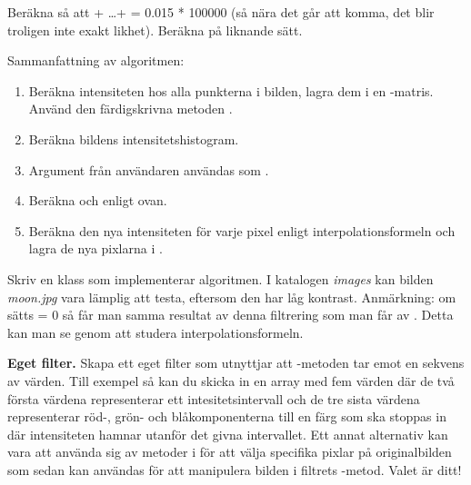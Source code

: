 Beräkna  så att  + \ldots +  = 0.015 * 100000 (så nära det går att komma, det blir troligen inte exakt likhet). Beräkna  på liknande sätt.

Sammanfattning av algoritmen:
\begin{enumerate}
	\item Beräkna intensiteten hos alla punkterna i bilden, lagra dem i en -matris. Använd den färdigskrivna metoden .
	\item Beräkna bildens intensitetshistogram.
	\item Argument från användaren användas som .
	\item Beräkna  och  enligt ovan.
	\item Beräkna den nya intensiteten för varje pixel enligt interpolationsformeln och lagra de nya pixlarna i .
\end{enumerate}
Skriv en klass  som implementerar algoritmen. I katalogen \emph{images} kan bilden \emph{moon.jpg} vara lämplig att testa, eftersom den har låg kontrast. Anmärkning: om  sätts = 0 så får man samma resultat av denna filtrering som man får av . Detta kan man se genom att studera interpolationsformeln.

\Task \textbf{Eget filter.} Skapa ett eget filter som utnyttjar att -metoden tar emot en sekvens av värden. Till exempel så kan du skicka in en array med fem värden där de två första värdena representerar ett intesitetsintervall och de tre sista värdena representerar röd-, grön- och blåkomponenterna till en färg som ska stoppas in där intensiteten hamnar utanför det givna intervallet. Ett annat alternativ kan vara att använda sig av metoder i  för att välja specifika pixlar på originalbilden som sedan kan användas för att manipulera bilden i filtrets -metod. Valet är ditt!
